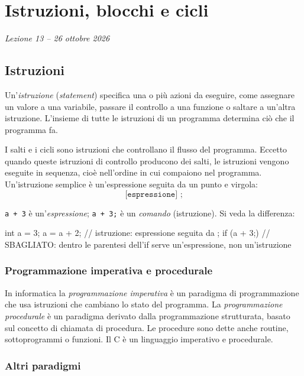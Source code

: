 \documentclass[11pt,a4paper]{article}
\begin{document}
\section[Istruzioni, blocchi e cicli (Lezione 13 -- 26 ottobre 2026)]{Istruzioni, blocchi e cicli}
\noindent\emph{Lezione 13 -- 26 ottobre 2026}
\subsection{Istruzioni}

Un'\emph{istruzione} (\emph{statement}) specifica una o più azioni da eseguire, come assegnare un valore a una variabile, passare il controllo a una funzione o saltare a un'altra istruzione. L'insieme di tutte le istruzioni di un programma determina ciò che il programma fa.

I salti e i cicli sono istruzioni che controllano il flusso del programma. Eccetto quando queste istruzioni di controllo producono dei salti, le istruzioni vengono eseguite in sequenza, cioè nell'ordine in cui compaiono nel programma. Un'istruzione semplice è un'espressione seguita da un punto e virgola:
\[
\texttt{[espressione] ;}
\]

\begin{esempio}
\lstinline|a + 3| è un'\emph{espressione}; \lstinline|a + 3;| è un \emph{comando} (istruzione). Si veda la differenza:
\begin{codice}
int a = 3;
a = a + 2;        // istruzione: espressione seguita da ;
if (a + 3;) { }   // SBAGLIATO: dentro le parentesi dell'if serve un'espressione, non un'istruzione
\end{codice}
\end{esempio}

\subsubsection{Programmazione imperativa e procedurale}

In informatica la \emph{programmazione imperativa} è un paradigma di programmazione che usa istruzioni che cambiano lo stato del programma. La \emph{programmazione procedurale} è un paradigma derivato dalla programmazione strutturata, basato sul concetto di chiamata di procedura. Le procedure sono dette anche routine, sottoprogrammi o funzioni. Il C è un linguaggio imperativo e procedurale.

\subsubsection{Altri paradigmi}
\end{document}
